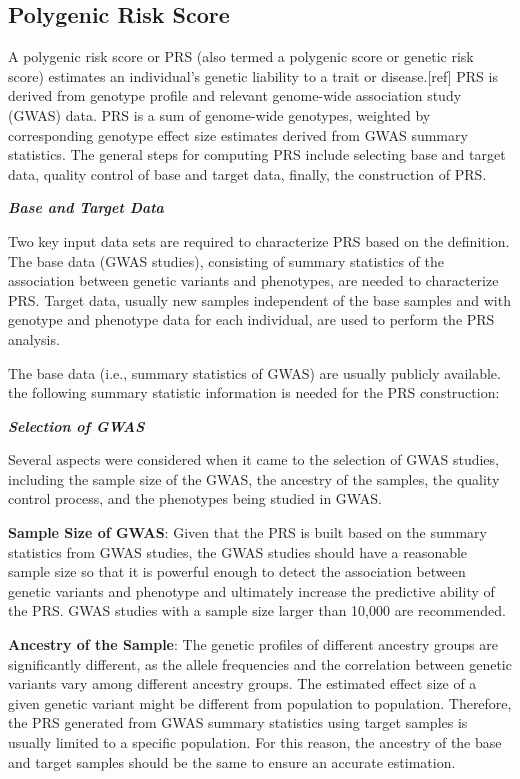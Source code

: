 \documentclass[
]{book}
\begin{document}
\hypertarget{polygenic-risk-score}{%
\subsection{Polygenic Risk Score}\label{polygenic-risk-score}}

A polygenic risk score or PRS (also termed a polygenic score or genetic risk score) estimates an individual's genetic liability to a trait or disease.{[}ref{]} PRS is derived from genotype profile and relevant genome-wide association study (GWAS) data. PRS is a sum of genome-wide genotypes, weighted by corresponding genotype effect size estimates derived from GWAS summary statistics. The general steps for computing PRS include selecting base and target data, quality control of base and target data, finally, the construction of PRS.

\textbf{\emph{Base and Target Data}}

Two key input data sets are required to characterize PRS based on the definition. The base data (GWAS studies), consisting of summary statistics of the association between genetic variants and phenotypes, are needed to characterize PRS. Target data, usually new samples independent of the base samples and with genotype and phenotype data for each individual, are used to perform the PRS analysis.

The base data (i.e., summary statistics of GWAS) are usually publicly available. the following summary statistic information is needed for the PRS construction:

\textbf{\emph{Selection of GWAS}}

Several aspects were considered when it came to the selection of GWAS studies, including the sample size of the GWAS, the ancestry of the samples, the quality control process, and the phenotypes being studied in GWAS.

\textbf{Sample Size of GWAS}: Given that the PRS is built based on the summary statistics from GWAS studies, the GWAS studies should have a reasonable sample size so that it is powerful enough to detect the association between genetic variants and phenotype and ultimately increase the predictive ability of the PRS. GWAS studies with a sample size larger than 10,000 are recommended.

\textbf{Ancestry of the Sample}: The genetic profiles of different ancestry groups are significantly different, as the allele frequencies and the correlation between genetic variants vary among different ancestry groups. The estimated effect size of a given genetic variant might be different from population to population. Therefore, the PRS generated from GWAS summary statistics using target samples is usually limited to a specific population. For this reason, the ancestry of the base and target samples should be the same to ensure an accurate estimation.
\end{document}
